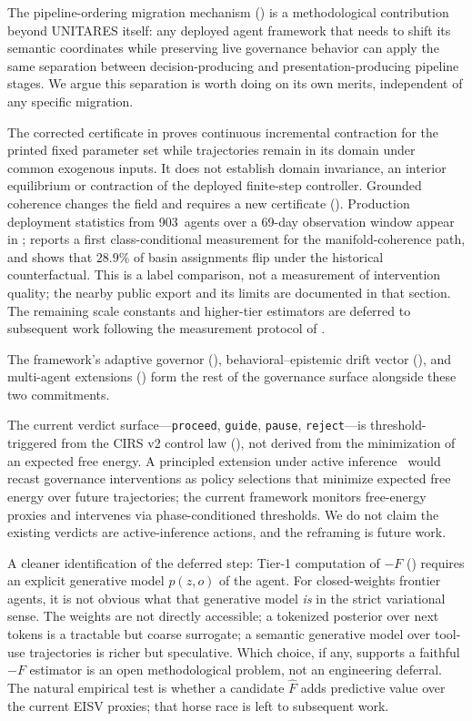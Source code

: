 \documentclass[11pt,twocolumn]{article}
\begin{document}
The pipeline-ordering migration mechanism
() is a methodological contribution
beyond UNITARES itself: any deployed agent framework that needs
to shift its semantic coordinates while preserving live governance
behavior can apply the same separation between decision-producing
and presentation-producing pipeline stages. We argue this
separation is worth doing on its own merits, independent of any
specific migration.

The corrected certificate in  proves
continuous incremental contraction for the printed fixed parameter
set while trajectories remain in its domain under common exogenous
inputs. It does not establish domain invariance, an interior
equilibrium or contraction of the deployed finite-step controller.
Grounded coherence changes the field and requires a new certificate
().
Production deployment statistics from 903~agents over a 69-day observation window
appear in ; 
reports a first class-conditional measurement for the
manifold-coherence path, and
 shows that $28.9\%$ of basin
assignments flip under the historical counterfactual. This
is a label comparison, not a measurement of intervention quality;
the nearby public export and its limits are documented in that
section. The remaining
scale constants and higher-tier estimators are deferred to
subsequent work following the measurement protocol of
.

The framework's adaptive governor (),
behavioral--epistemic drift vector (),
and multi-agent extensions () form the rest of
the governance surface alongside these two commitments.

The current verdict surface---\texttt{proceed}, \texttt{guide},
\texttt{pause}, \texttt{reject}---is threshold-triggered from the
CIRS v2 control law (), not derived from the
minimization of an expected free energy. A principled extension
under active inference~\cite{parr2022active,dacosta2020active}
would recast governance interventions as policy selections that
minimize expected free energy over future trajectories; the current
framework monitors free-energy proxies and intervenes via
phase-conditioned thresholds. We do not claim the existing verdicts
are active-inference actions, and the reframing is future work.

A cleaner identification of the deferred step: Tier-1 computation
of $-F$ () requires an explicit
generative model $p(z, o)$ of the agent. For closed-weights frontier
agents, it is not obvious what that generative model \emph{is} in
the strict variational sense. The weights are not directly
accessible; a tokenized posterior over next tokens is a tractable
but coarse surrogate; a semantic generative model over tool-use
trajectories is richer but speculative. Which choice, if any,
supports a faithful $-F$ estimator is an open methodological
problem, not an engineering deferral. The natural empirical test
is whether a candidate $\hat{F}$ adds predictive value over the
current EISV proxies; that horse race is left to subsequent work.
\end{document}
